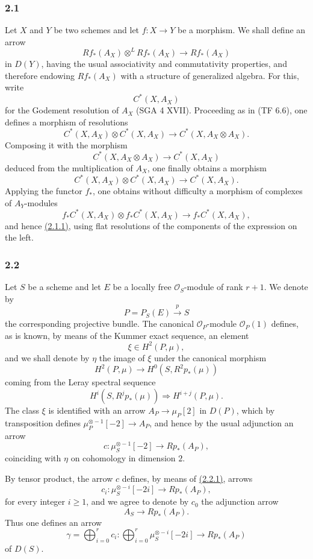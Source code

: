 \documentclass[11pt]{article}
\begin{document}
\subsubsection*{2.1}\label{sga5:VII:subsubsection:2.1}
Let $X$ and $Y$ be two schemes and let $f:X\to Y$ be a morphism. We shall define an arrow
\[
Rf_*(A_X)\otimes^L Rf_*(A_X)\longrightarrow Rf_*(A_X)
\tag{2.1.1}\label{sga5:VII:equation:2.1.1}
\]
in $D(Y)$, having the usual associativity and commutativity properties, and therefore endowing $Rf_*(A_X)$ with a structure of generalized algebra. For this, write
\[
C^*(X,A_X)
\]
for the Godement resolution of $A_X$ (SGA 4 XVII). Proceeding as in (TF 6.6), one defines a morphism of resolutions
\[
C^*(X,A_X)\otimes C^*(X,A_X)\longrightarrow C^*(X,A_X\otimes A_X).
\]
Composing it with the morphism
\[
C^*(X,A_X\otimes A_X)\longrightarrow C^*(X,A_X)
\]
deduced from the multiplication of $A_X$, one finally obtains a morphism
\[
C^*(X,A_X)\otimes C^*(X,A_X)\longrightarrow C^*(X,A_X).
\tag{2.1.2}\label{sga5:VII:equation:2.1.2}
\]
Applying the functor $f_*$, one obtains without difficulty a morphism of complexes of $A_Y$-modules
\[
f_*C^*(X,A_X)\otimes f_*C^*(X,A_X)\longrightarrow f_*C^*(X,A_X),
\]
and hence \hyperref[sga5:VII:equation:2.1.1]{(2.1.1)}, using flat resolutions of the components of the expression on the left.

\subsubsection*{2.2}\label{sga5:VII:subsubsection:2.2}
Let $S$ be a scheme and let $E$ be a locally free $\mathcal O_S$-module of rank $r+1$. We denote by
\[
P=P_S(E)\xrightarrow{p}S
\]
the corresponding projective bundle. The canonical $\mathcal O_P$-module $\mathcal O_P(1)$ defines, as is known, by means of the Kummer exact sequence, an element
\[
\xi\in H^2(P,\mu),
\]
and we shall denote by $\eta$ the image of $\xi$ under the canonical morphism
\[
H^2(P,\mu)\longrightarrow H^0(S,R^2p_*(\mu))
\]
coming from the Leray spectral sequence
\[
H^i(S,R^jp_*(\mu))\Rightarrow H^{i+j}(P,\mu).
\]
The class $\xi$ is identified with an arrow $A_P\to\mu_P[2]$ in $D(P)$, which by transposition defines $\mu_P^{\otimes -1}[-2]\to A_P$, and hence by the usual adjunction an arrow
\[
c:\mu_S^{\otimes -1}[-2]\longrightarrow Rp_*(A_P),
\]
coinciding with $\eta$ on cohomology in dimension $2$.

By tensor product, the arrow $c$ defines, by means of \hyperref[sga5:VII:theorem:2.2.1]{(2.2.1)}, arrows
\[
c_i:\mu_S^{\otimes -i}[-2i]\longrightarrow Rp_*(A_P),
\]
for every integer $i\ge1$, and we agree to denote by $c_0$ the adjunction arrow
\[
A_S\longrightarrow Rp_*(A_P).
\]
Thus one defines an arrow
\[
\gamma=\bigoplus_{i=0}^{r}c_i:
\bigoplus_{i=0}^{r}\mu_S^{\otimes -i}[-2i]\longrightarrow Rp_*(A_P)
\]
of $D(S)$.
\end{document}
